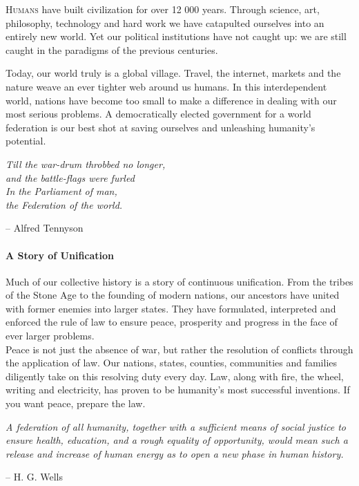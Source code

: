 \documentclass[11pt,a4paper]{article}
\begin{document}
\begin{multicols}{2}
\lettrine[lraise=0.1, lines=2]{\textsc{H}}{umans} have built civilization for over 12 000 years. Through science, art, philosophy, technology and hard work we have catapulted ourselves into an entirely new world. Yet our political institutions have not caught up: we are still caught in the paradigms of the previous centuries.

\noindent Today, our world truly is a global village. Travel, the internet, markets and the nature weave an ever tighter web around us humans. In this interdependent world, nations have become too small to make a difference in dealing with our most serious problems. A democratically elected government for a world federation is our best shot at saving ourselves and unleashing humanity’s potential.


\begin{shaded*}
\noindent \textit{Till the war-drum throbbed no longer,\\
and the battle-flags were furled\\
\noindent In the Parliament of man, \\
the Federation of the world.}
\begin{flushright}
-- Alfred Tennyson
\end{flushright}
\vspace{-12pt}
\end{shaded*}


\paragraph{A Story of Unification}

Much of our collective history is a story of continuous unification.
From the tribes of the Stone Age to the founding of modern nations, our ancestors have united with former enemies into larger states.
They have formulated, interpreted and enforced the rule of law to ensure peace, prosperity and progress in the face of ever larger problems.\\
\noindent Peace is not just the absence of war, but rather the  resolution of conflicts through the application of law.
Our nations, states, counties, communities and families diligently take on this resolving duty every day.
Law, along with fire, the wheel, writing and electricity, has proven to be humanity's most successful inventions.
If you want peace, prepare the law.

\begin{shaded*}
\noindent \textit{A federation of all humanity, together with a sufficient means of social justice to ensure health, education, and a rough equality of opportunity, would mean such a release and increase of human energy as to open a new phase in human history.}
\begin{flushright}
-- H. G. Wells
\end{flushright}
\vspace{-12pt}
\end{shaded*}


\end{multicols}
\end{document}
